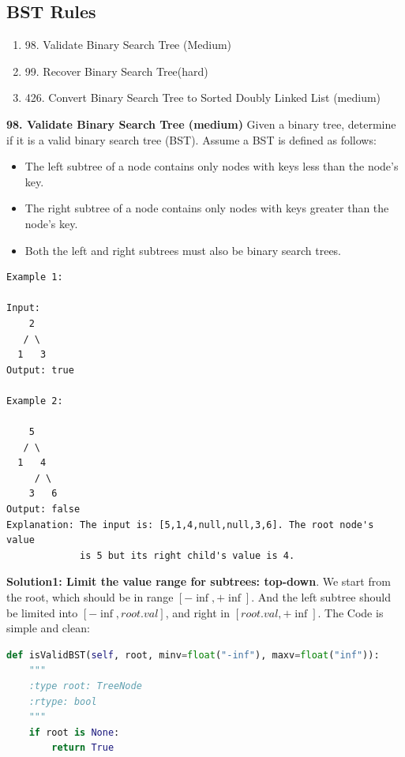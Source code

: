 \documentclass[../main.tex]{subfiles}
\begin{document}
\subsection{BST Rules}
\begin{enumerate}
    \item 98. Validate Binary Search Tree (Medium)
    \item 99. Recover Binary Search Tree(hard)
    \item 426. Convert Binary Search Tree to Sorted Doubly Linked List (medium)
\end{enumerate}
\begin{examples}[resume]
\item \textbf{98. Validate Binary Search Tree (medium)} Given a binary tree, determine if it is a valid binary search tree (BST). Assume a BST is defined as follows:
\begin{itemize}
    \item  The left subtree of a node contains only nodes with keys less than the node's key.
    \item The right subtree of a node contains only nodes with keys greater than the node's key.
    \item Both the left and right subtrees must also be binary search trees.
    \end{itemize}
\begin{lstlisting}
Example 1:

Input:
    2
   / \
  1   3
Output: true

Example 2:

    5
   / \
  1   4
     / \
    3   6
Output: false
Explanation: The input is: [5,1,4,null,null,3,6]. The root node's value
             is 5 but its right child's value is 4.
\end{lstlisting}
\textbf{Solution1: Limit the value range for subtrees: top-down}. We start from the root, which should be in range $[-\inf, +\inf]$. And the left subtree should be limited into $[-\inf, root.val]$, and right in $[root.val, +\inf]$. The Code is simple and clean:
\begin{lstlisting}[language=Python]
def isValidBST(self, root, minv=float("-inf"), maxv=float("inf")):
    """
    :type root: TreeNode
    :rtype: bool
    """
    if root is None:
        return True
    

\end{lstlisting}
\end{examples}
\end{document}
